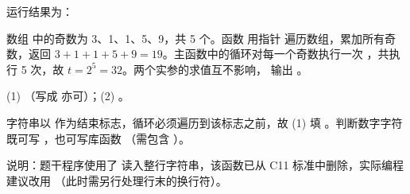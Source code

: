 \documentclass[a4paper,11pt]{article}
\begin{document}
\begin{qgroup}
\q 运行结果为：
\begin{analysis}
数组  中的奇数为 3、1、1、5、9，共 5 个。函数  用指针  遍历数组，累加所有奇数，返回 $3+1+1+5+9=19$。主函数中的循环对每一个奇数执行一次 ，共执行 5 次，故 $t=2^{5}=32$。两个实参的求值互不影响， 输出 。
\end{analysis}

\q (1) （写成  亦可）；\quad (2) 。
\begin{analysis}
字符串以  作为结束标志，循环必须遍历到该标志之前，故 (1) 填 。判断数字字符既可写 ，也可写库函数 （需包含 ）。
\end{analysis}
\begin{analysis}
说明：题干程序使用了  读入整行字符串，该函数已从 C11 标准中删除，实际编程建议改用 （此时需另行处理行末的换行符）。
\end{analysis}
\end{qgroup}
\end{document}
